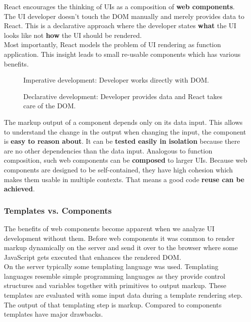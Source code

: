 React encourages the thinking of UIs as a composition of \textbf{web components}. The UI developer doesn't touch the DOM manually and merely provides data to React. This is a declarative approach where the developer states \textbf{what} the UI looks like not \textbf{how} the UI should be rendered. \\
Most importantly, React models the problem of UI rendering as function application. This insight leads to small re-usable components which has various benefits.

\begin{figure}[!htb]
  \caption{Imperative development: Developer works directly with DOM.}
\end{figure}

\begin{figure}[!htb]
  \caption{Declarative development: Developer provides data and React takes care of the DOM.}
\end{figure}

The markup output of a component depends only on its data input. This allows to understand the change in the output when changing the input, the component is \textbf{easy to reason about}. It can be \textbf{tested easily in isolation} because there are no other dependencies than the data input. Analogous to function composition, such web components can be \textbf{composed} to larger UIs. Because web components are designed to be self-contained, they have high cohesion which makes them usable in multiple contexts. That means a good code \textbf{reuse can be achieved}.

\subsubsection{Templates vs. Components}
The benefits of web components become apparent when we analyze UI development without them. Before web components it was common to render markup dynamically on the server and send it over to the browser where some JavaScript gets executed that enhances the rendered DOM. \\
On the server typically some templating language was used. Templating languages resemble simple programming languages as they provide control structures and variables together with primitives to output markup. These templates are evaluated with some input data during a template rendering step. The output of that templating step is markup. Compared to components templates have major drawbacks.

